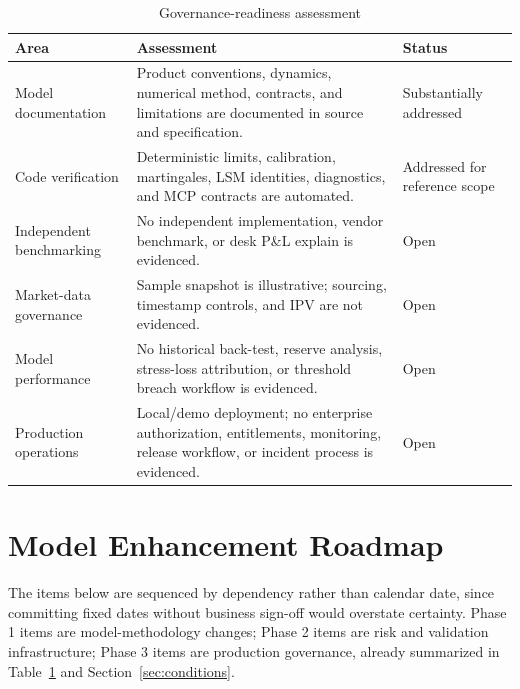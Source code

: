 \documentclass[conference]{IEEEtran}
\begin{document}
\begin{table}[H]
\centering
\begin{tabularx}{\columnwidth}{>{\raggedright\arraybackslash}p{}>{\raggedright\arraybackslash}X>{\raggedright\arraybackslash}p{}}
\toprule
\textbf{Area} & \textbf{Assessment} & \textbf{Status} \\
\midrule
Model documentation & Product conventions, dynamics, numerical method, contracts, and limitations are documented in source and specification. & Substantially addressed \\
Code verification & Deterministic limits, calibration, martingales, LSM identities, diagnostics, and MCP contracts are automated. & Addressed for reference scope \\
Independent benchmarking & No independent implementation, vendor benchmark, or desk P\&L explain is evidenced. & Open \\
Market-data governance & Sample snapshot is illustrative; sourcing, timestamp controls, and IPV are not evidenced. & Open \\
Model performance & No historical back-test, reserve analysis, stress-loss attribution, or threshold breach workflow is evidenced. & Open \\
Production operations & Local/demo deployment; no enterprise authorization, entitlements, monitoring, release workflow, or incident process is evidenced. & Open \\
\bottomrule
\end{tabularx}
\caption{Governance-readiness assessment\label{tab:governance}}
\end{table}

\section{Model Enhancement Roadmap}
\label{sec:roadmap}

The items below are sequenced by dependency rather than calendar date, since committing fixed dates without business sign-off would overstate certainty. Phase 1 items are model-methodology changes; Phase 2 items are risk and validation infrastructure; Phase 3 items are production governance, already summarized in Table~\ref{tab:governance} and Section~\ref{sec:conditions}.
\end{document}

